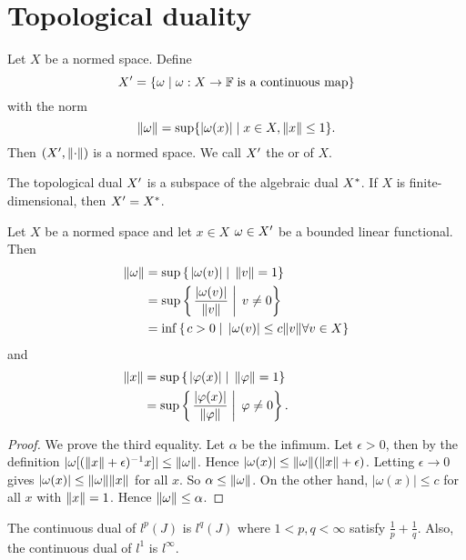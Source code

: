 \section{Topological duality}
\begin{definition}
Let $X$ be a normed space. Define
\[ {X}^\prime = \{  \omega \;|\; \omega:X\to \mathbb{F} \;\text{is a continuous map}\} \]
with the norm
\[ \lVert\omega\rVert = \sup\{|\omega(x)|\;|\; x\in X, \lVert x\rVert\leq 1\}. \]
Then $({X}^\prime,\lVert\cdot\rVert)$ is a normed space. We call ${X}^\prime$ the  or  of $X$.
\end{definition}
\begin{lemma}
The topological dual ${X}^\prime$ is a subspace of the algebraic dual ${X}^*$. If $X$ is finite-dimensional, then ${X}^\prime={X}^*$.
\end{lemma}
\begin{lemma} Let $X$ be a normed space and
let $x\in X$ $\omega\in {X}^\prime$ be a bounded linear functional. Then
\begin{align*}
\lVert\omega\rVert &= \sup\left\{\left. |\omega(v)| \;\right|\; \lVert v\rVert=1  \right\} \\
&= \sup\left\{\left. \frac{|\omega(v)|}{\lVert v\rVert} \;\right|\; v\neq 0 \right\} \\
&= \inf\left\{\left. c>0 \;\right|\; |\omega(v)|\leq c\lVert v\rVert\forall v\in X \right\}
\end{align*}
and
\begin{align*}
\norm{x} &= \sup\setbuilder{|\varphi(x)|}{ \norm{\varphi}=1} \qquad\qquad\quad\\ %
&= \sup\setbuilder{\frac{|\varphi(x)|}{\norm{\varphi}}}{\varphi\neq 0}.
\end{align*}
\end{lemma}
\begin{proof}
We prove the third equality. Let $\alpha$ be the infimum. Let $\epsilon>0$, then by the definition $|\omega[(\lVert x\rVert+\epsilon)^{-1}x]|\leq \lVert\omega\rVert$. Hence $|\omega(x)|\leq \lVert\omega\rVert(\lVert x\rVert+\epsilon)$. Letting $\epsilon\to 0$ gives $|\omega(x)|\leq \lVert\omega\rVert\lVert x\rVert$ for all $x$. So $\alpha\leq \lVert\omega\rVert$. On the other hand, $|\omega(x)|\leq c$ for all $x$ with $\lVert x\rVert=1$. Hence $\lVert\omega\rVert\leq \alpha$.
\end{proof}

\begin{proposition}
The continuous dual of $l^p(J)$ is $l^q(J)$ where $1<p,q<\infty$ satisfy $\frac{1}{p}+\frac{1}{q}$.
Also, the continuous dual of $l^1$ is $l^\infty$.
\end{proposition}

